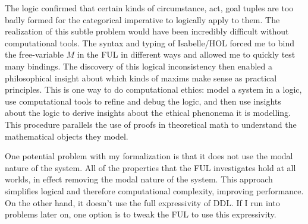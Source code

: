 \begin{isabellebody}
\begin{isamarkuptext}
The logic confirmed that certain kinds
of circumstance, act, goal tuples are too badly formed for the categorical imperative to logically 
apply to them. The realization of this subtle problem would have been incredibly difficult without 
computational tools. The syntax and typing of Isabelle/HOL forced me to bind the free-variable $M$
in the FUL in different ways and allowed me to quickly test many bindings. The discovery of this 
logical inconsistency then enabled a philosophical insight about which kinds of maxims make sense as 
practical principles. This is one way to do computational ethics: model a system in a logic, use 
computational tools to refine and debug the logic, and then use insights about the logic to derive 
insights about the ethical phenonema it is modelling. This procedure parallels the use of proofs in 
theoretical math to understand the mathematical objects they model.%
\end{isamarkuptext}\isamarkuptrue%
%
\begin{isamarkuptext}%
One potential problem with my formalization is that it does not use the modal nature of the system. 
All of the properties that the FUL investigates hold at all worlds, in effect removing the modal nature 
of the system. This approach simplifies logical and therefore computational complexity, improving 
performance. On the other hand, it doesn't use the full expressivity of DDL. If I run into problems 
later on, one option is to tweak the FUL to use this expressivity.%
\end{isamarkuptext}\isamarkuptrue%
%
\isadelimtheory
%
\endisadelimtheory
%
\isatagtheory
{}\isamarkupfalse%
%
\endisatagtheory
{\isafoldtheory}%
%
\isadelimtheory
%
\endisadelimtheory
\isanewline
%
\end{isabellebody}%
\endinput
